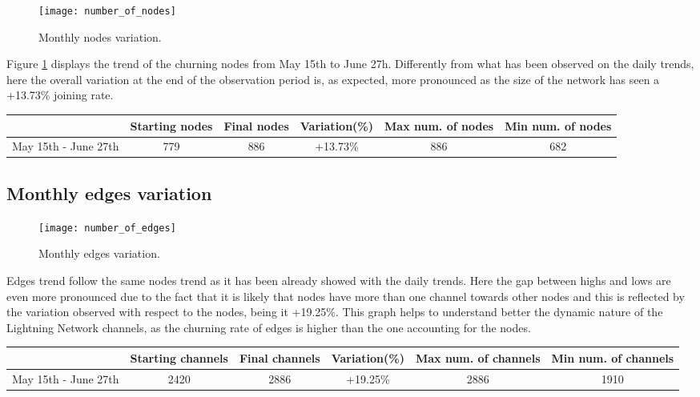 	\begin{figure}
		\centering
		\texttt{[image: number\_of\_nodes]}
		\caption{Monthly nodes variation.}
		\label{monthly_nodes}
	\end{figure}
	
	Figure \ref{monthly_nodes} displays the trend of the churning nodes from May 15th to June 27h. Differently from what has been observed on the daily trends, here the overall variation at the end of the observation period is, as expected, more pronounced as the size of the network has seen a +13.73\% joining rate.
	
	\begin{center}
		\begin{tabulary}{\linewidth}{| L | C | C | C | C | C |}
			\hline	
			& Starting nodes & Final nodes  & Variation(\%) & Max num. of nodes & Min num. of nodes \\ \hline
			May 15th - June 27th & 779 & 886 & +13.73\% & 886 & 682 \\ \hline
		\end{tabulary}
	\end{center}
	
	\subsection{Monthly edges variation}
	\begin{figure}
		\centering
		\texttt{[image: number\_of\_edges]}
		\caption{Monthly edges variation.}
		\label{monthly_edges}
	\end{figure}

	Edges trend follow the same nodes trend as it has been already showed with the daily trends. Here the gap between highs and lows are even more pronounced due to the fact that it is likely that nodes have more than one channel towards other nodes and this is reflected by the variation observed with respect to the nodes, being it +19.25\%. This graph helps to understand better the dynamic nature of the Lightning Network channels, as the churning rate of edges is higher than the one accounting for the nodes. 
	
	\begin{center}
		\begin{tabulary}{\linewidth}{| L | C | C | C | C | C |}
			\hline	
			& Starting channels & Final channels  & Variation(\%) & Max num. of channels & Min num. of channels \\ \hline
			May 15th - June 27th & 2420 & 2886 & +19.25\% & 2886 & 1910 \\ \hline
		\end{tabulary}
	\end{center}
	

